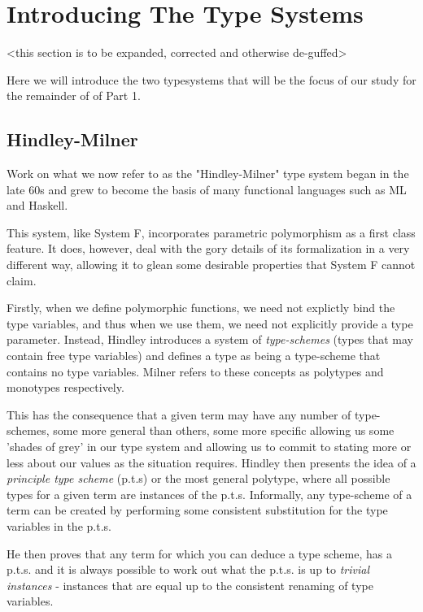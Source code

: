 \chapter{Introducing The Type Systems}

<this section is to be expanded, corrected and otherwise de-guffed>

Here we will introduce the two typesystems that will be the focus of
our study for the remainder of of Part 1.

\section{Hindley-Milner}

Work on what we now refer to as the "Hindley-Milner" type system began
in the late 60s and grew to become the basis of many functional
languages such as ML and Haskell.

This system, like System F, incorporates parametric polymorphism as a
first class feature. It does, however, deal with the gory details of
its formalization in a very different way, allowing it to glean some
desirable properties that System F cannot claim.

Firstly, when we define polymorphic functions, we need not explictly
bind the type variables, and thus when we use them, we need not
explicitly provide a type parameter. Instead, Hindley introduces a
system of \textit{type-schemes} (types that may contain free type
variables) and defines a type as being a type-scheme that contains no
type variables. Milner refers to these concepts as polytypes and
monotypes respectively.

This has the consequence that a given term may have any number of
type-schemes, some more general than others, some more specific
allowing us some 'shades of grey' in our type system and allowing us
to commit to stating more or less about our values as the situation
requires. Hindley then presents the idea of a \textit{principle type
  scheme} (p.t.s) or the most general polytype, where all possible
types for a given term are instances of the p.t.s. Informally, any
type-scheme of a term can be created by performing some consistent
substitution for the type variables in the p.t.s. 

He then proves that any term for which you can deduce a type scheme,
has a p.t.s. and it is always possible to work out what the p.t.s. is
up to \textit{trivial instances} - instances that are equal up to the
consistent renaming of type variables.

